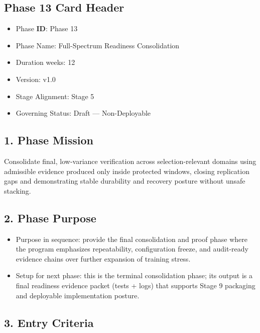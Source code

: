 \documentclass[10pt]{article}
\begin{document}
\subsection*{Phase 13 Card Header}
{}

\begin{itemize}
\item Phase \textbf{ID}: Phase 13
\item Phase Name: Full-Spectrum Readiness Consolidation
\item Duration weeks: 12
\item Version: v1.0
\item Stage Alignment: Stage 5
\item Governing Status: Draft — Non-Deployable
\end{itemize}

\subsection*{1. Phase Mission}

Consolidate final, low-variance verification across selection-relevant domains using admissible evidence produced only inside protected windows, closing replication gaps and demonstrating stable durability and recovery posture without unsafe stacking.

\subsection*{2. Phase Purpose}

\begin{itemize}
\item Purpose in sequence: provide the final consolidation and proof phase where the program emphasizes repeatability, configuration freeze, and audit-ready evidence chains over further expansion of training stress.
\item Setup for next phase: this is the terminal consolidation phase; its output is a final readiness evidence packet (tests + logs) that supports Stage 9 packaging and deployable implementation posture.
\end{itemize}

\subsection*{3. Entry Criteria}
\end{document}
